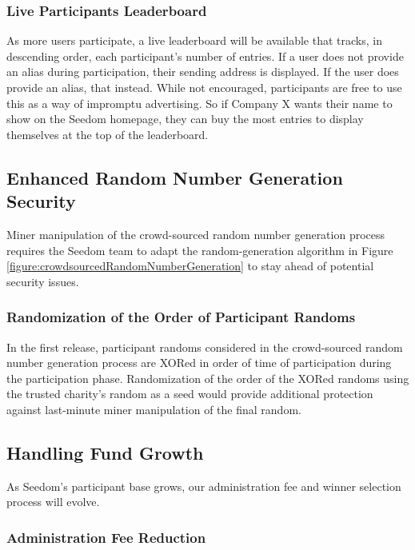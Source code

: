 \documentclass[11pt]{article}
\begin{document}
\subsubsection{Live Participants Leaderboard}

As more users participate, a live leaderboard will be available that tracks, in descending order, each participant's number of entries. If a user does not provide an alias during participation, their sending address is displayed. If the user does provide an alias, that instead. While not encouraged, participants are free to use this as a way of impromptu advertising. So if Company X wants their name to show on the Seedom homepage, they can buy the most entries to display themselves at the top of the leaderboard.

\subsection{Enhanced Random Number Generation Security}

Miner manipulation of the crowd-sourced random number generation process requires the Seedom team to adapt the random-generation algorithm in Figure \ref{figure:crowdsourcedRandomNumberGeneration} to stay ahead of potential security issues.

\subsubsection{Randomization of the Order of Participant Randoms}

In the first release, participant randoms considered in the crowd-sourced random number generation process are XORed in order of time of participation during the participation phase. Randomization of the order of the XORed randoms using the trusted charity's random as a seed would provide additional protection against last-minute miner manipulation of the final random.

\subsection{Handling Fund Growth}

As Seedom's participant base grows, our administration fee and winner selection process will evolve.

\subsubsection{Administration Fee Reduction}
\end{document}
